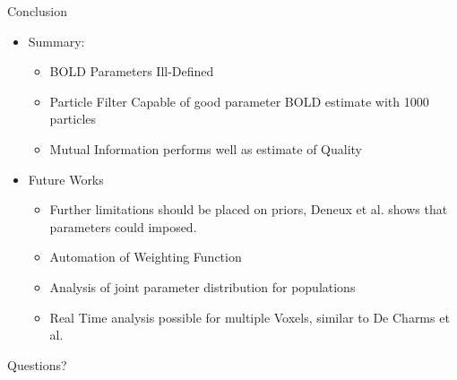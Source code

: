 \documentclass{beamer}
\begin{document}
\begin{frame}{Conclusion}
\begin{itemize}
    \item Summary:
    \begin{itemize}
    \item BOLD Parameters Ill-Defined
    \item Particle Filter Capable of good parameter BOLD estimate with 1000 particles
    \item Mutual Information performs well as estimate of Quality
    \end{itemize}
    \item Future Works
    \begin{itemize}
        \item Further limitations should be placed on priors, Deneux 
            et al. \cite{Deneux2006} shows that parameters could imposed.
        \item Automation of Weighting Function
        \item Analysis of joint parameter distribution for populations
        \item Real Time analysis possible for multiple Voxels, similar to
            De Charms et al. \cite{DeCharms2005}

    \end{itemize}
\end{itemize}
\end{frame}

\begin{frame}{Questions?}
\end{frame}


\begin{frame}[allowframebreaks]
  
  
\end{frame}
\end{document}
